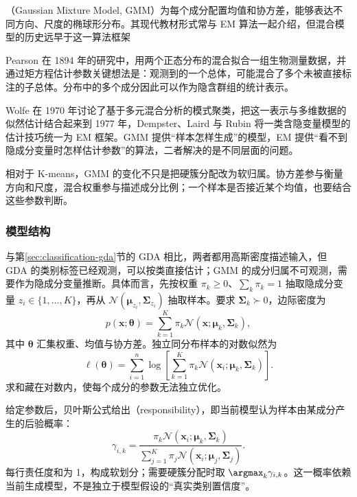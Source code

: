 （Gaussian Mixture Model, GMM）为每个成分配置均值和协方差，能够表达不同方向、尺度的椭球形分布。其现代教材形式常与 EM 算法一起介绍，但混合模型的历史远早于这一算法框架

Pearson 在 1894 年的研究中，用两个正态分布的混合拟合一组生物测量数据，并通过矩方程估计参数关键想法是：观测到的一个总体，可能混合了多个未被直接标注的子总体。分布中的多个成分因此可以作为隐含群组的统计表示。

Wolfe 在 1970 年讨论了基于多元混合分析的模式聚类，把这一表示与多维数据的似然估计结合起来到 1977 年，Dempster、Laird 与 Rubin 将一类含隐变量模型的估计技巧统一为 EM 框架。GMM 提供“样本怎样生成”的模型，EM 提供“看不到隐成分变量时怎样估计参数”的算法，二者解决的是不同层面的问题。

相对于 K-means，GMM 的变化不只是把硬簇分配改为软归属。协方差参与衡量方向和尺度，混合权重参与描述成分比例；一个样本是否接近某个均值，也要结合这些参数判断。

\subsubsection{模型结构}

与第\ref{sec:classification-gda}节的 GDA 相比，两者都用高斯密度描述输入，但 GDA 的类别标签已经观测，可以按类直接估计；GMM 的成分归属不可观测，需要作为隐成分变量推断。具体而言，先按权重 $\pi_k\geq0$、$\sum_k\pi_k=1$ 抽取隐成分变量 $z_i\in\{1,\ldots,K\}$，再从 $\mathcal{N}(\bm{\mu}_{z_i},\bm{\Sigma}_{z_i})$ 抽取样本。要求 $\bm{\Sigma}_k\succ0$，边际密度为
\begin{equation}
 p(\bm{x};\bm{\theta})
 =\sum_{k=1}^K\pi_k
   \mathcal{N}(\bm{x};\bm{\mu}_k,\bm{\Sigma}_k),
 \label{eq:clustering-gmm}
\end{equation}
其中 $\bm{\theta}$ 汇集权重、均值与协方差。独立同分布样本的对数似然为
\[
 \ell(\bm{\theta})
 =\sum_{i=1}^n\log\left[
 \sum_{k=1}^K\pi_k
 \mathcal{N}(\bm{x}_i;\bm{\mu}_k,\bm{\Sigma}_k)\right].
\]
求和藏在对数内，使每个成分的参数无法独立优化。

给定参数后，贝叶斯公式给出（responsibility），即当前模型认为样本由某成分产生的后验概率：
\begin{equation}
 \gamma_{i,k}
 =\frac{\pi_k\mathcal{N}(\bm{x}_i;\bm{\mu}_k,\bm{\Sigma}_k)}
 {\sum_{j=1}^K\pi_j
       \mathcal{N}(\bm{x}_i;\bm{\mu}_j,\bm{\Sigma}_j)}.
 \label{eq:clustering-responsibility}
\end{equation}
每行责任度和为 1，构成软划分；需要硬簇分配时取 $\argmax_k\gamma_{i,k}$。这一概率依赖当前生成模型，不是独立于模型假设的“真实类别置信度”。

